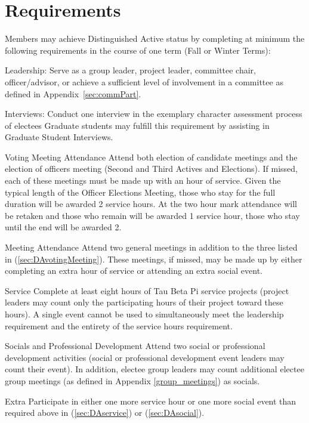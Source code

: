 \section{Requirements}
Members may achieve Distinguished Active status by completing at minimum the following requirements in the course of one term (Fall or Winter Terms):
\begin{enumsubsection}
\item{Leadership:}
Serve as a group leader, project leader, committee chair, officer/advisor, or achieve a sufficient level of involvement in a committee as defined in Appendix~\ref{sec:commPart}.
\item{Interviews:}
Conduct one interview in the exemplary character assessment process of electees Graduate students may fulfill this requirement by assisting in Graduate Student Interviews.
\item{Voting Meeting Attendance}\label{sec:DAvotingMeeting}
Attend both election of candidate meetings and the election of officers meeting (Second and Third Actives and Elections).
If missed, each of these meetings must be made up with an hour of service.
Given the typical length of the Officer Elections Meeting, those who stay for the full duration will be awarded 2 service hours.
At the two hour mark attendance will be retaken and those who remain will be awarded 1 service hour, those who stay until the end will be awarded 2.
\item{Meeting Attendance}
Attend two general meetings in addition to the three listed in (\ref{sec:DAvotingMeeting}).
These meetings, if missed, may be made up by either completing an extra hour of service or attending an extra social event.
\item{Service}\label{sec:DAservice}
Complete at least eight hours of Tau Beta Pi service projects (project leaders may count only the participating hours of their project toward these hours).
A single event cannot be used to simultaneously meet the leadership requirement and the entirety of the service hours requirement.
\item{Socials and Professional Development}
\label{sec:DAsocial}Attend two social or professional development activities (social or professional development event leaders may count their event).
In addition, electee group leaders may count additional electee group meetings (as defined in Appendix \ref{group_meetings}) as socials.
\item{Extra}
Participate in either one more service hour or one more social event than required above in (\ref{sec:DAservice}) or (\ref{sec:DAsocial}).

\end{enumsubsection}

